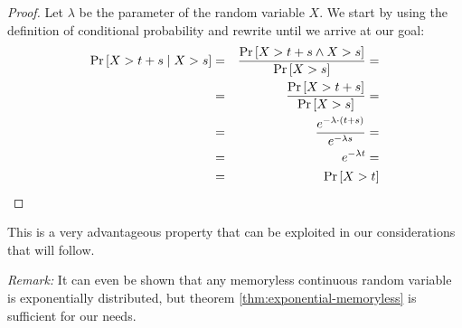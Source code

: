 \begin{proof}
  Let $\lambda$ be the parameter of the random variable $X$.
  We start by using the definition of conditional probability and rewrite until we arrive at our goal:
  \begin{eqnarray*}
    \operatorname{Pr}\left[X>t+s \mid X>s\right] &=& \frac{\operatorname{Pr}\left[X>t+s \wedge X>s\right]}{\operatorname{Pr}\left[X>s\right]} = \\
    &=& \frac{\operatorname{Pr}\left[X>t+s\right]}{\operatorname{Pr}\left[X>s\right]} = \\
    &=& \frac{e^{-\lambda \cdot(t+s)}}{e^{-\lambda s}} = \\
    &=& e^{-\lambda t} = \\
    &=& \operatorname{Pr}\left[X>t\right]
  \end{eqnarray*}
\end{proof}

This is a very advantageous property that can be exploited in our considerations that will follow.

\emph{Remark:} It can even be shown that any memoryless continuous random variable is exponentially distributed, but theorem \ref{thm:exponential-memoryless} is sufficient for our needs.




